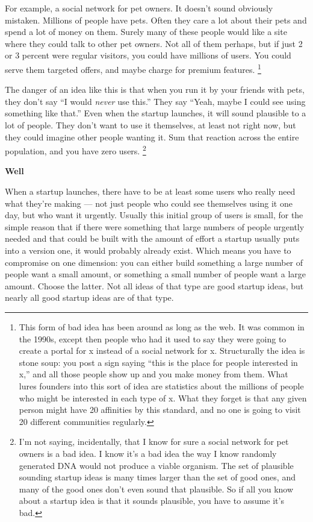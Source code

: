 For example, a social network for pet owners. It doesn't sound obviously
mistaken. Millions of people have pets. Often they care a lot about
their pets and spend a lot of money on them. Surely many of these people
would like a site where they could talk to other pet owners. Not all of
them perhaps, but if just 2 or 3 percent were regular visitors, you
could have millions of users. You could serve them targeted offers, and
maybe charge for premium features. \footnote{This form of bad idea has been around as long as the web. It was
common in the 1990s, except then people who had it used to say they were
going to create a portal for x instead of a social network for x.
Structurally the idea is stone soup: you post a sign saying ``this is
the place for people interested in x,'' and all those people show up and
you make money from them. What lures founders into this sort of idea are
statistics about the millions of people who might be interested in each
type of x. What they forget is that any given person might have 20
affinities by this standard, and no one is going to visit 20 different
communities regularly.}

The danger of an idea like this is that when you run it by your friends
with pets, they don't say ``I would \emph{never} use this.'' They say
``Yeah, maybe I could see using something like that.'' Even when the
startup launches, it will sound plausible to a lot of people. They don't
want to use it themselves, at least not right now, but they could
imagine other people wanting it. Sum that reaction across the entire
population, and you have zero users. \footnote{I'm not saying, incidentally, that I know for sure a social
network for pet owners is a bad idea. I know it's a bad idea the way I
know randomly generated DNA would not produce a viable organism. The set
of plausible sounding startup ideas is many times larger than the set of
good ones, and many of the good ones don't even sound that plausible. So
if all you know about a startup idea is that it sounds plausible, you
have to assume it's bad.}

\textbf{Well}

When a startup launches, there have to be at least some users who really
need what they're making --- not just people who could see themselves
using it one day, but who want it urgently. Usually this initial group
of users is small, for the simple reason that if there were something
that large numbers of people urgently needed and that could be built
with the amount of effort a startup usually puts into a version one, it
would probably already exist. Which means you have to compromise on one
dimension: you can either build something a large number of people want
a small amount, or something a small number of people want a large
amount. Choose the latter. Not all ideas of that type are good startup
ideas, but nearly all good startup ideas are of that type.

